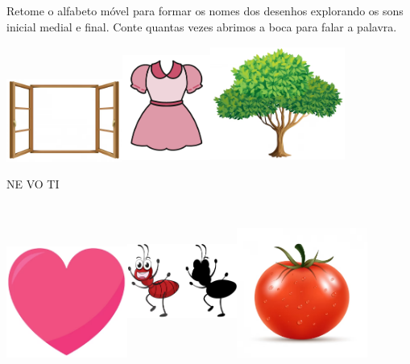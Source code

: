 Retome o alfabeto móvel para formar os nomes dos desenhos explorando
os sons inicial medial e final. Conte quantas vezes abrimos a boca para
falar a palavra.

\includegraphics[width=1.50139in,height=1.07153in]{media/image64.png}\includegraphics[width=1.12986in,height=1.39097in]{media/image65.png}\includegraphics[width=1.74752in,height=1.49479in]{media/image66.png}

NE VO TI

\includegraphics[width=1.56319in,height=1.45278in]{media/image67.png}\includegraphics[width=1.42083in,height=1.99583in]{media/image68.png}\includegraphics[width=1.67778in,height=1.67778in]{media/image69.png}

